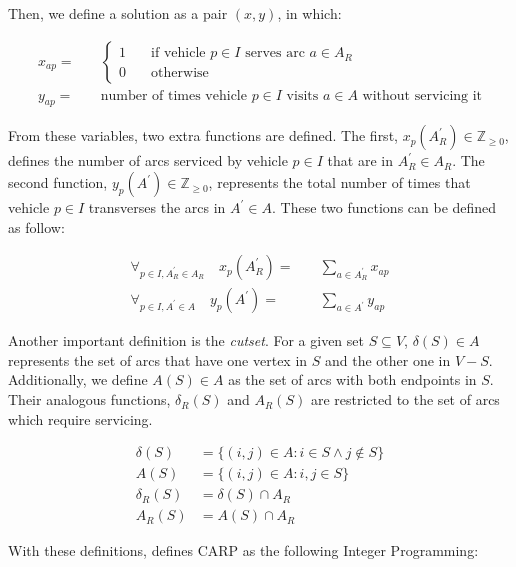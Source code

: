 Then, we define a solution as a pair $(x, y)$, in which:

\begin{align*}
x_{ap} = & \quad \left\{
	\begin{array}{ll}
		1 & \quad \mbox{if vehicle $p \in I$ serves arc $a \in A_R$} \\
		0 & \quad \mbox{otherwise}
	\end{array}
	\right. \\
y_{ap} = & \quad \mbox{number of times vehicle $p \in I$ visits $a \in A$ without servicing it}
\end{align*}

From these variables, two extra functions are defined. The first,
$x_p(A_R^\prime) \in \mathbb{Z}_{\geq0}$, defines the number of arcs serviced
by vehicle $p \in I$ that are in $A_R^\prime \in A_R$. The second function,
$y_p(A^\prime) \in \mathbb{Z}_{\geq0}$, represents the total number of times
that vehicle $p \in I$ transverses the arcs in $A^\prime \in A$. These two functions can be defined as follow:

\begin{align}
	\forall_{p \in I, A_R^\prime \in A_R}	\quad x_p(A_R^\prime) = & \quad \sum_{a \in A_R^\prime} x_{ap} \\
	\forall_{p \in I, A^\prime \in A}	\quad y_p(A^\prime) =   & \quad \sum_{a \in A^\prime} y_{ap}
\end{align}

Another important definition is the \textit{cutset}. For a given set $S
\subseteq V$, $\delta(S) \in A$ represents the set of arcs that have one vertex
in $S$ and the other one in $V - S$. Additionally, we define $A(S) \in A$ as
the set of arcs with both endpoints in $S$. Their analogous functions,
$\delta_R(S)$ and $A_R(S)$ are restricted to the set of arcs which require
servicing.

\begin{align}
	\delta(S)	&= \{ (i, j) \in A : i \in S \wedge j \notin S \} \\
	A(S)		&= \{ (i, j) \in A : i,j \in S \} \\
	\delta_R(S)	&= \delta(S) \cap A_R \\
	A_R(S)		&= A(S) \cap A_R
\end{align}

With these definitions, \citet{Belenguer98} defines CARP as the following
Integer Programming:


